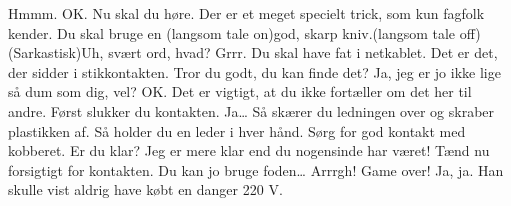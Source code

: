 \documentclass[10pt]{article}
\begin{document}
\begin{sketch}
Hmmm. OK. Nu skal du høre. Der er et meget specielt trick, som kun 
fagfolk kender. Du skal bruge en (langsom tale on)god, skarp kniv.(langsom tale off)
(Sarkastisk)Uh, svært ord, hvad?
Grrr. Du skal have fat i netkablet. Det er det, der sidder i 
stikkontakten. Tror du godt, du kan finde det?
Ja, jeg er jo ikke lige så dum som dig, vel?
OK. Det er vigtigt, at du ikke fortæller om det her til andre. Først
slukker du kontakten.
Ja\ldots
{}Så skærer du ledningen over og skraber plastikken af. Så holder du
en leder i hver hånd. Sørg for god kontakt med kobberet. Er du klar?
Jeg er mere klar end du nogensinde har været!
Tænd nu forsigtigt for kontakten. Du kan jo bruge foden\ldots
{}Arrrgh!  Game over!
Ja, ja. Han skulle vist aldrig have købt en danger 220 V.

\end{sketch}
\end{document}
